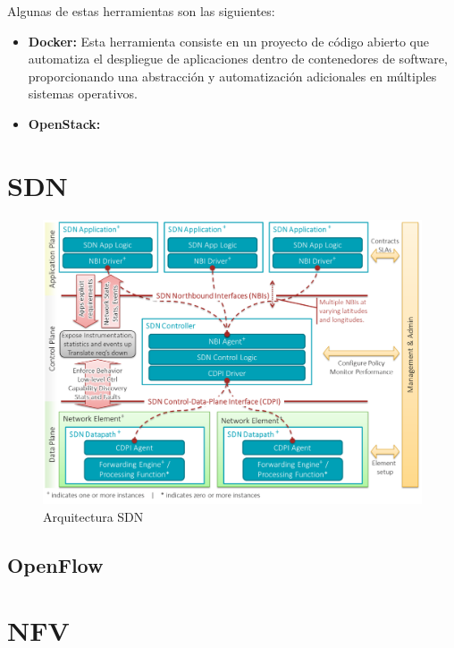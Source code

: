 Algunas de estas herramientas son las siguientes:

\begin{itemize}
	\item \textbf{Docker:} Esta herramienta consiste en un proyecto de código abierto que automatiza el despliegue de aplicaciones dentro de contenedores de software, proporcionando una abstracción y automatización adicionales en múltiples sistemas operativos.
	
	\item \textbf{OpenStack:} 
\end{itemize}



\section{SDN}
\label{sec:sdn}

\begin{figure}[!ht]
	\centering
	\includegraphics[width=0.75\linewidth]{imagenes/arquitectura_sdn}
	\caption{Arquitectura SDN}
	\label{fig:arquitecturasdn}
\end{figure}


\subsection{OpenFlow}
\label{subsec:openflow}

\section{NFV}
\label{sec:nfv}


\cleardoublepage